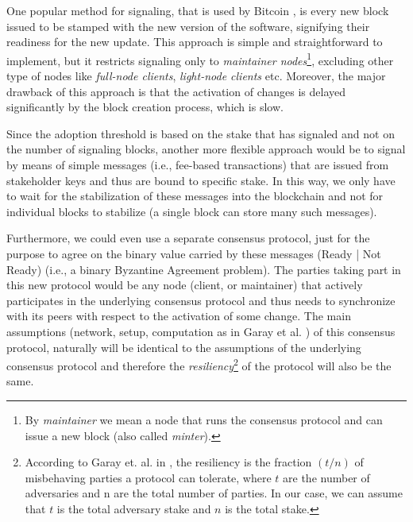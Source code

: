 One popular method for signaling, that is used by Bitcoin \cite{bitcoin}, is
every new block issued to be stamped with the new version of the software,
signifying their readiness for the new update. This approach is simple and
straightforward to implement, but it restricts signaling only to
\emph{maintainer nodes}\footnote{By \emph{maintainer} we mean a node that runs
  the consensus protocol and can issue a new block (also called
  \emph{minter}).}, excluding other type of nodes like \emph{full-node clients},
\emph{light-node clients} etc. Moreover, the major drawback of this approach is
that the activation of changes is delayed significantly by the block creation
process, which is slow.

Since the adoption threshold is based on the stake that has signaled and not on
the number of signaling blocks, another more flexible approach would be to
signal by means of simple messages (i.e., fee-based transactions) that are
issued from stakeholder keys and thus are bound to specific stake. In this way,
we only have to wait for the stabilization of these messages into the blockchain
and not for individual blocks to stabilize (a single block can store many such
messages).

Furthermore, we could even use a separate consensus protocol, just for the
purpose to agree on the binary value carried by these messages (Ready | Not
Ready) (i.e., a binary Byzantine Agreement problem). The parties taking part in
this new protocol would be any node (client, or maintainer) that actively
participates in the underlying consensus protocol and thus needs to synchronize
with its peers with respect to the activation of some change. The main
assumptions (network, setup, computation as in Garay et al. \cite{sok}) of this
consensus protocol, naturally will be identical to the assumptions of the
underlying consensus protocol and therefore the
\emph{resiliency}\footnote{According to Garay et. al. in \cite{sok}, the
  resiliency is the fraction $(t/n)$ of misbehaving parties a protocol can
  tolerate, where $t$ are the number of adversaries and n are the total number
  of parties. In our case, we can assume that $t$ is the total adversary stake
  and $n$ is the total stake.} of the protocol will also be the same.

